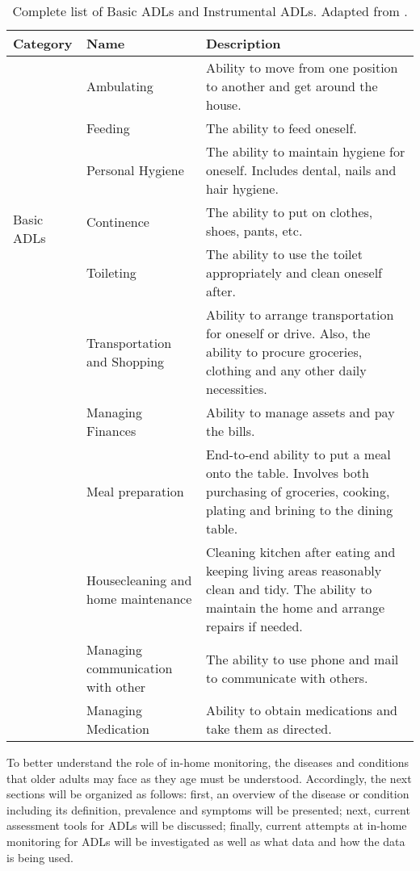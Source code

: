 \renewcommand{\arraystretch}{1.25}
\begin{table}[h!]
    \centering
    \caption{Complete list of Basic ADLs and Instrumental ADLs. Adapted from \cite{edemekong_activities_2022}.}
    \label{table:ADLs}
    \begin{tabular}{ p{0.9in} p{1.5in} p{2.7in} } 
    \hline
    \textbf{Category} & \textbf{Name} & \textbf{Description} \\
    \hline
    \multirow{6}{4em}{Basic ADLs} & Ambulating & Ability to move from one position to another and get around the house. \\ 
    & Feeding & The ability to feed oneself. \\ 
    & Personal Hygiene & The ability to maintain hygiene for oneself. Includes dental, nails and hair hygiene. \\ 
    & Continence & The ability to put on clothes, shoes, pants, etc. \\ 
    & Toileting & The ability to use the toilet appropriately and clean oneself after. \\ 
    \hline
    \multirow{6}{4em}{Instrumental ADLs} & Transportation and Shopping & Ability to arrange transportation for oneself or drive. Also, the ability to procure groceries, clothing and any other daily necessities. \\
    & Managing Finances & Ability to manage assets and pay the bills. \\
    & Meal preparation & End-to-end ability to put a meal onto the table. Involves both purchasing of groceries, cooking, plating and brining to the dining table. \\
    & Housecleaning and home maintenance & Cleaning kitchen after eating and keeping living areas reasonably clean and tidy. The ability to maintain the home and arrange repairs if needed. \\
    & Managing communication with other & The ability to use phone and mail to communicate with others. \\
    & Managing Medication & Ability to obtain medications and take them as directed. \\
    \hline
    \end{tabular}
\end{table}

\clearpage
To better understand the role of in-home monitoring, the diseases and conditions that older adults may face as they age must be understood. Accordingly, the next sections will be organized as follows: first, an overview of the disease or condition including its definition, prevalence and symptoms will be presented; next, current assessment tools for ADLs will be discussed; finally, current attempts at in-home monitoring for ADLs will be investigated as well as what data and how the data is being used.

